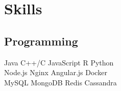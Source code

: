 \documentclass[]{20161017-v}
\begin{document}
\begin{minipage}[t]{0.33\textwidth}



\section{Skills}
\subsection{Programming}
Java \textbullet{}  C++/C \textbullet{} JavaScript \textbullet{} R \textbullet{} Python \\
Node.js \textbullet{} Nginx \textbullet{} Angular.js \textbullet{} Docker \\
MySQL \textbullet{} MongoDB \textbullet{} Redis \textbullet{} Cassandra
\sectionsep

%
%

\end{minipage} 
\hfill
\end{document}
